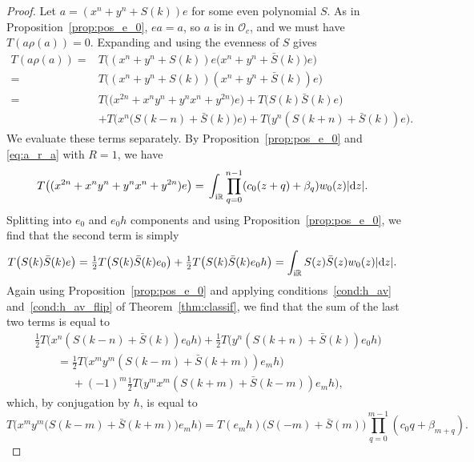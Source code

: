 \documentclass[pdftex]{sigma}
\newcommand\RR{\mathbb{R}}
\newcommand\cO{\mathcal{O}}
\renewcommand\d{\mathrm{d}}
\renewcommand\S{\bar{S}}
\newcommand\thalf{\ensuremath{\tfrac12}}
\numberwithin{equation}{section}
\theoremstyle{definition}
\begin{document}
\begin{proof}
 Let $a = (x^n + y^n + S(k))e$ for some even polynomial $S$.
 As in Proposition~\ref{prop:pos_e_0}, $ea = a$, so $a$ is in $\cO_c$,
 and we must have $T(a \rho(a)) = 0$.
 Expanding and using the evenness of $S$ gives
 \begin{align*}
 T(a \rho(a)) ={}& T\bigl( (x^n + y^n + S(k)) e
 \bigl(x^n + y^n + \S(k)\bigr) e \bigr) \\
 ={}& T\bigl( (x^n + y^n + S(k)) (x^n + y^n + \S(k)) e \bigr) \\
 ={}& T\bigl( \bigl(x^{2n} + x^n y^n + y^n x^n + y^{2n}\bigr) e \bigr)
 + T\bigl( S(k) \S(k) e \bigr) \\
 & + T\bigl( x^n \bigl(S(k - n) + \S(k)\bigr) e \bigr)
 + T\bigl( y^n (S(k + n) + \S(k)) e \bigr).
 \end{align*}
 We evaluate these terms separately.
 By Proposition~\ref{prop:pos_e_0} and \eqref{eq:a_r_a} with $R = 1$, we have
 \begin{align*}
 T\bigl( (x^{2n} + x^n y^n + y^n x^n + y^{2n}) e \bigr)
 ={}& \int_{{\rm i}\RR} \prod\limits_{q = 0}^{n - 1}
 (c_0 (z + q) + \beta_q) w_0 (z) |\d z|.
 \end{align*}
 Splitting into $e_0$ and $e_0 h$ components
 and using Proposition~\ref{prop:pos_e_0},
 we find that the second term is simply
 \begin{align*}
 T\bigl( S(k) \S(k) e \bigr)
 ={}& \thalf T\bigl( S(k) \S(k) e_0 \bigr)
 + \thalf T\bigl( S(k) \S(k) e_0 h \bigr)
 = \int_{{\rm i}\RR} S(z) \S(z) w_0 (z) |\d z|.
 \end{align*}
 Again using Proposition~\ref{prop:pos_e_0}
 and applying conditions~\ref{cond:h_av} and~\ref{cond:h_av_flip}
 of Theorem~\ref{thm:classif},
 we find that
 the sum of the last two terms is equal to
 \begin{gather*}
 \thalf T\bigl( x^n (S(k - n) + \S(k)) e_0 h \bigr)
 + \thalf T\bigl( y^n (S(k + n) + \S(k)) e_0 h \bigr) \\
 \qquad= \thalf T\bigl( x^m y^m (S(k - m) + \S(k + m)) e_m h \bigr)\\
 \phantom{ \qquad= }{}
 + (-1)^m \thalf T\bigl( y^m x^m (S(k + m) + \S(k - m))
 e_m h \bigr),
 \end{gather*}
 which, by conjugation by $h$, is equal to
 \begin{equation*}
 T\bigl(x^m y^m \bigl(S(k - m) + \S(k + m)\bigr) e_m h\bigr)
 = T(e_m h) \bigl(S(-m ) + \S(m)\bigr)
 \prod\limits_{q = 0}^{m - 1} (c_0 q + \beta_{m + q}).
 \end{equation*}

\end{proof}
\end{document}
